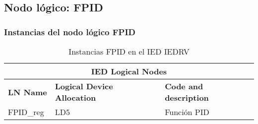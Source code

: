 
\subsection{Nodo l\'ogico: 			 FPID}

    \subsubsection{Instancias del nodo l\'ogico FPID}
    \begin{table}[H]
    \begin{center}
    \begin{tabular}{|l|l|p{6.8cm}|}
            \hline
            \multicolumn{3}{|c|}{\cellcolor[gray]{0.8} \textbf{IED Logical Nodes} } \\
            \hline
            \textbf{LN Name} & \textbf{Logical Device Allocation} & \textbf{Code and description} \\
            \hline
            FPID\_reg & LD5 & Funci\'on PID \\			
            \hline
    \end{tabular}
    \caption{Instancias FPID en el IED IEDRV}
    \label{table:lnInstFPID_reg}
    \end{center}
    \end{table}
    
    
    

